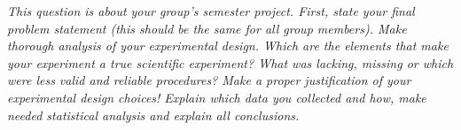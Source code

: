 \textit{This question is about your group’s semester project.
First, state your final problem statement (this should be the same for all group members).
Make thorough analysis of your experimental design. Which are the elements that make your experiment a true scientific experiment? What was lacking, missing or which were less valid and reliable procedures? Make a proper justification of your experimental design choices!
Explain which data you collected and how, make needed statistical analysis and explain all conclusions.}